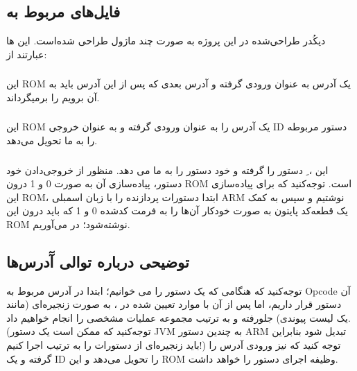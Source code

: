 \subsection*{فایل‌های مربوط به 
	}


دیکُدر طراحی‌شده در این پروژه به صورت
چند ماژول
طراحی شده‌است. این 
ها
عبارتند از: 
\subsubsection*{
}
این ROM یک آدرس به عنوان ورودی گرفته و آدرس
بعدی که پس از این آدرس باید به آن برویم را برمیگرداند. 
\subsubsection*{
}
این ROM یک آدرس را به عنوان ورودی گرفته و به عنوان
خروجی ID دستور مربوطه را به ما تحویل می‌دهد. 
\subsubsection*{
}
این 
،
ِ
دستور را گرفته و خود دستور را به ما می
دهد. منظور از خروجی‌دادن خود دستور، پیاده‌سازی آن به صورت 0 و 1 درون ROM  است. توجه‌کنید که برای پیاده‌سازی این ROM، ابتدا دستورات پردازنده را با زبان
اسمبلی ARM نوشتیم و سپس به کمک یک قطعه‌کد پایتون به صورت خودکار آن‌ها را به فرمت کدشده 0 و 1 که باید درون این ROM نوشته‌شود؛ در می‌آوریم.
\subsection*{توضیحی درباره توالی آٓدرس‌ها}
توجه‌کنید که هنگامی که یک دستور را می خوانیم؛ ابتدا در آدرس مربوط به Opcode آن دستور قرار داریم، اما پس از آن با موارد تعیین شده در 
،
به صورت زنجیره‌ای (مانند یک لیست پیوندی) جلورفته و به ترتیب مجموعه عملیات مشخصی را انجام خواهیم داد. (توجه‌کنید که ممکن است یک دستور JVM به چندین دستور ARM تبدیل شود بنابراین باید زنجیره‌ای از دستورات را به ترتیب اجرا کنیم!) توجه کنید که
نیز ورودی آدرس را گرفته و یک ID را تحویل 
می‌دهد و این ROM وظیفه اجرای دستور را خواهد داشت.

